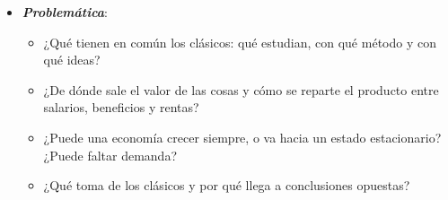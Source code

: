 \documentclass[11pt]{article}
\begin{document}
\begin{itemize}
\begin{itemize}
\begin{itemize}
    \end{itemize}
  \item En 1776, \textcite{Smith1776Wealth} los reúne en un sistema: con la \emph{Riqueza de las naciones} empieza la , que llega hasta los \emph{Principios} de \textcite{Mill1848Principles} y domina la disciplina hasta la revolución marginalista de los años 70 .
  \item Es la época de la Revolución industrial, de la Revolución francesa y de las guerras con Francia, y la escuela es casi enteramente británica. Sus autores escriben en una economía que crece, pero con una población que aumenta deprisa y una tierra que no aumenta.
  \item El nombre de \emph{clásicos} se lo pone su gran crítico, , que llama «economía política clásica» a la que, desde , estudia las relaciones reales de producción\nocite{Marx1867Kapital}; \textcite[cap.~1]{Keynes1936} lo extenderá a los neoclásicos .
  \end{itemize}

\item \textbf{\emph{Problemática}}:
  \begin{itemize}
  \item ¿Qué tienen en común los clásicos: qué estudian, con qué método y con qué ideas?
  \item ¿De dónde sale el valor de las cosas y cómo se reparte el producto entre salarios, beneficios y rentas?
  \item ¿Puede una economía crecer siempre, o va hacia un estado estacionario? ¿Puede faltar demanda?
  \item ¿Qué toma  de los clásicos y por qué llega a conclusiones opuestas?
  \end{itemize}


\end{itemize}
\end{document}
